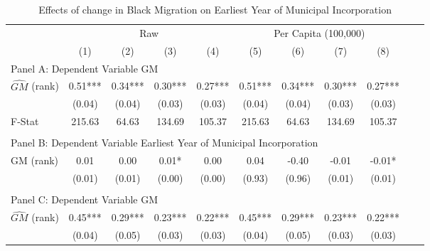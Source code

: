  \begin{table}[htbp]\centering {} \begin{threeparttable} \caption{Effects of change in Black Migration on Earliest Year of Municipal Incorporation} \begin{tabular}{l*{10}{c}} \toprule
                &\multicolumn{4}{c}{Raw}                                    &\multicolumn{4}{c}{Per Capita (100,000)}                   \\\cmidrule(lr){2-5}\cmidrule(lr){6-9}
                &\multicolumn{1}{c}{(1)}   &\multicolumn{1}{c}{(2)}   &\multicolumn{1}{c}{(3)}   &\multicolumn{1}{c}{(4)}   &\multicolumn{1}{c}{(5)}   &\multicolumn{1}{c}{(6)}   &\multicolumn{1}{c}{(7)}   &\multicolumn{1}{c}{(8)}   \\
\cmidrule(lr){1-9}
\multicolumn{8}{l}{Panel A: Dependent Variable GM}\\
\cmidrule(lr){1-9}
$\hat{GM}$ (rank)&       0.51***&       0.34***&       0.30***&       0.27***&       0.51***&       0.34***&       0.30***&       0.27***\\
                &     (0.04)   &     (0.04)   &     (0.03)   &     (0.03)   &     (0.04)   &     (0.04)   &     (0.03)   &     (0.03)   \\
\midrule
F-Stat          &     215.63   &      64.63   &     134.69   &     105.37   &     215.63   &      64.63   &     134.69   &     105.37   \\
\cmidrule[\heavyrulewidth](lr){1-9} \\ \cmidrule[\heavyrulewidth](lr){1-9}
\multicolumn{8}{l}{Panel B: Dependent Variable Earliest Year of Municipal Incorporation}\\
\cmidrule(lr){1-9}
GM  (rank)      &       0.01   &       0.00   &       0.01*  &       0.00   &       0.04   &      -0.40   &      -0.01   &      -0.01*  \\
                &     (0.01)   &     (0.01)   &     (0.00)   &     (0.00)   &     (0.93)   &     (0.96)   &     (0.01)   &     (0.01)   \\
\cmidrule[\heavyrulewidth](lr){1-9} \\ \cmidrule[\heavyrulewidth](lr){1-9}
\multicolumn{8}{l}{Panel C: Dependent Variable GM}\\
\cmidrule(lr){1-9}
$\hat{GM}$ (rank)&       0.45***&       0.29***&       0.23***&       0.22***&       0.45***&       0.29***&       0.23***&       0.22***\\
                &     (0.04)   &     (0.05)   &     (0.03)   &     (0.03)   &     (0.04)   &     (0.05)   &     (0.03)   &     (0.03)   \\

\end{tabular}
\end{threeparttable}
\end{table}

